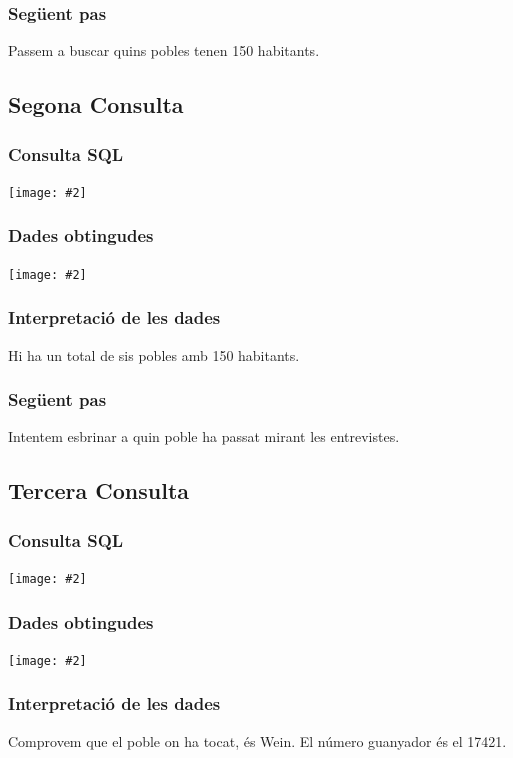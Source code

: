 \documentclass[a4paper,12pt]{article}
\newcommand{\mygraphic}[2][width=\textwidth]{\begin{center}
		\centering\texttt{[image: \#2]}\par
\end{center}}
\begin{document}
\subsubsection{Següent pas}
Passem a buscar quins pobles tenen 150 habitants.

\newpage
\subsection{Segona Consulta}

\subsubsection{Consulta SQL}
\mygraphic{imatges/3.png}

\subsubsection{Dades obtingudes}
\mygraphic{imatges/4.png}

\subsubsection{Interpretació de les dades}
Hi ha un total de sis pobles amb 150 habitants.

\subsubsection{Següent pas}
Intentem esbrinar a quin poble ha passat mirant les entrevistes.

\newpage
\subsection{Tercera Consulta}

\subsubsection{Consulta SQL}
\mygraphic{imatges/5.png}

\subsubsection{Dades obtingudes}
\mygraphic{imatges/6.png}

\subsubsection{Interpretació de les dades}
Comprovem que el poble on ha tocat, és Wein. El número guanyador és el 17421.
\end{document}
